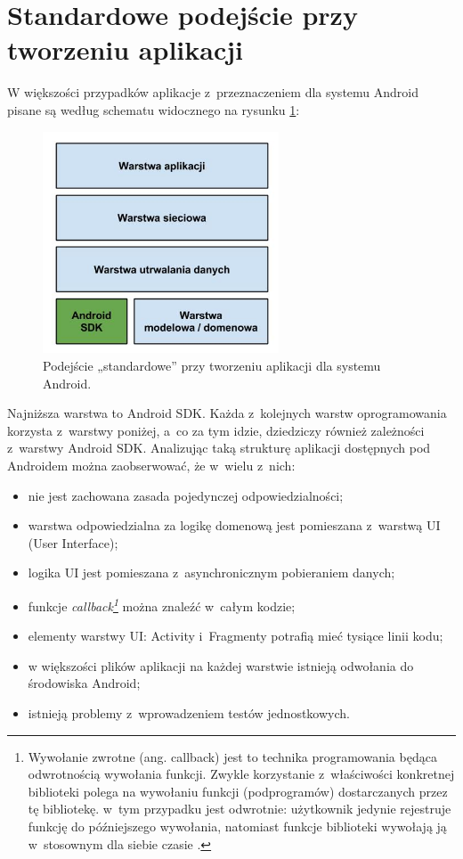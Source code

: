 \section{Standardowe podejście przy tworzeniu aplikacji}
\label{standardowe_podejscie}
W większości przypadków aplikacje z~przeznaczeniem dla systemu Android pisane są według schematu widocznego na rysunku \ref{fig:opis_problemu}:

\begin{figure}[!htb]
    \centering
    \includegraphics[width=7cm]{imgs/ch3_opis_problemu_1.jpg}
    \caption
{Podejście „standardowe” przy tworzeniu aplikacji dla systemu Android.}
    \label{fig:opis_problemu}
\end{figure} 

\newpage
Najniższa warstwa to Android SDK. Każda z~kolejnych warstw oprogramowania korzysta z~warstwy poniżej, a~co za tym idzie, dziedziczy również zależności z~warstwy Android SDK. Analizując taką strukturę aplikacji dostępnych pod Androidem można zaobserwować, że w~wielu z~nich:
\begin{itemize}
\item
nie jest zachowana zasada pojedynczej odpowiedzialności;
\item
warstwa odpowiedzialna za logikę domenową jest pomieszana z~warstwą UI (User Interface);
\item
logika UI jest pomieszana z~asynchronicznym pobieraniem danych;
\item
funkcje \textit{callback\footnote{Wywołanie zwrotne (ang. callback) jest to technika programowania będąca odwrotnością wywołania funkcji. Zwykle korzystanie z~właściwości konkretnej biblioteki polega na wywołaniu funkcji (podprogramów) dostarczanych przez tę bibliotekę. w~tym przypadku jest odwrotnie: użytkownik jedynie rejestruje funkcję do późniejszego wywołania, natomiast funkcje biblioteki wywołają ją w~stosownym dla siebie czasie  \cite{website:wikipedia}.}} można znaleźć w~całym kodzie;
\item
elementy warstwy UI: Activity i~Fragmenty potrafią mieć tysiące linii kodu;
\item
w większości plików aplikacji na każdej warstwie istnieją odwołania do środowiska Android;
\item
istnieją problemy z~wprowadzeniem testów jednostkowych.
\end{itemize}


